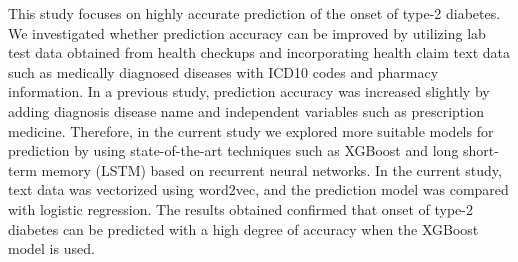 This study focuses on highly accurate prediction of the onset of type-2 diabetes. We investigated whether prediction accuracy can be improved by utilizing lab test data obtained from health checkups and incorporating health claim text data such as medically diagnosed diseases with ICD10 codes and pharmacy information. In a previous study, prediction accuracy was increased slightly by adding diagnosis disease name and independent variables such as prescription medicine. Therefore, in the current study we explored more suitable models for prediction by using state-of-the-art techniques such as XGBoost and long short-term memory (LSTM) based on recurrent neural networks. In the current study, text data was vectorized using word2vec, and the prediction model was compared with logistic regression. The results obtained confirmed that onset of type-2 diabetes can be predicted with a high degree of accuracy when the XGBoost model is used.
